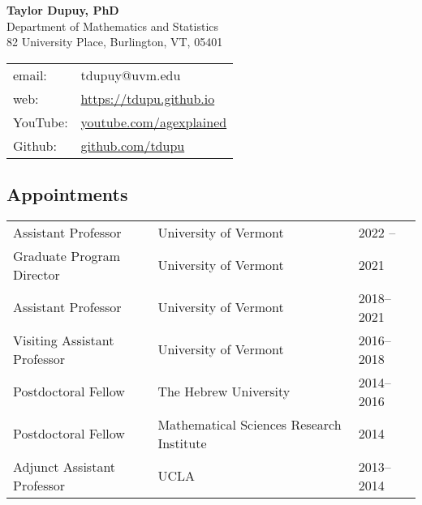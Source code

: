 \documentclass[a4paper,10pt]{article}
\begin{document}

\begin{multicols}{2}
\begin{flushleft}
    {\Large \bf Taylor Dupuy, PhD}\\
	Department of Mathematics and Statistics \\
	82 University Place, Burlington, VT, 05401  
	\newline \newline
	\begin{tabular}{ll}
		email: & tdupuy@uvm.edu\\
		web: & \url{https://tdupu.github.io}\\
		YouTube: & \url{youtube.com/agexplained} \\
		Github: & \url{github.com/tdupu} 
	\end{tabular}
\end{flushleft}
\end{multicols}

 
 
 \subsection*{Appointments}
 \vspace*{-10pt}
\begin{center}
\begin{tabular}{p{1.7in} p{3.5in}p{1in}}
Assistant Professor & University of Vermont & 2022 -- \\
Graduate Program Director & University of Vermont & 2021 \\
Assistant Professor & University of Vermont & 2018--2021 \\
Visiting Assistant Professor & University of Vermont & 2016--2018 \\
Postdoctoral Fellow & The Hebrew University& 2014--2016 \\
Postdoctoral Fellow & Mathematical Sciences Research Institute & 2014 \\
Adjunct Assistant Professor & UCLA & 2013--2014 \\
\end{tabular}
\end{center}
\end{document}
